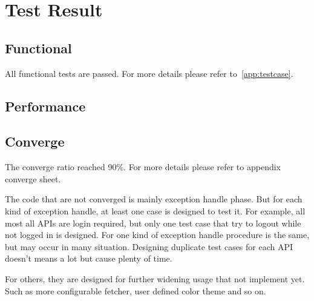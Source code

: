 \section{Test Result}
\label{sec:test_result}
  \subsection{Functional}
    All functional tests are passed. For more details please refer to~\ref{app:testcase}.
  \subsection{Performance}
  \subsection{Converge}
    The converge ratio reached 90\%.
    For more details please refer to appendix converge sheet.

    The code that are not converged is mainly exception handle phase.
    But for each kind of exception handle, at least one case is designed to test it.
    For example, all most all APIs are login required,
    but only one test case that try to logout while not logged in is designed.
    For one kind of exception handle procedure is the same, but may occur in many situation.
    Designing duplicate test cases for each API doesn't means a lot but cause plenty of time.

    For others, they are designed for further widening usage that not implement yet.
    Such as more configurable fetcher, user defined color theme and so on.
